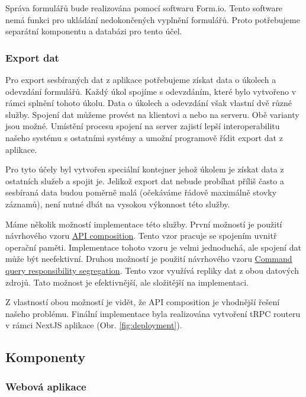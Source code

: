 Správa formulářů bude realizována pomocí softwaru Form.io.
Tento software nemá funkci pro ukládání nedokončených vyplnění formulářů.
Proto potřebujeme separátní komponentu a databázi pro tento účel.

\subsubsection{Export dat}\label{subsubsec:export-dat}

Pro export sesbíraných dat z aplikace potřebujeme získat data o úkolech a odevzdání formulářů.
Každý úkol spojíme s odevzdáním, které bylo vytvořeno v rámci splnění tohoto úkolu.
Data o úkolech a odevzdání však vlastní dvě různé služby.
Spojení dat můžeme provést na klientovi a nebo na serveru.
Obě varianty jsou možné.
Umístění procesu spojení na server zajistí lepší interoperabilitu našeho systému s ostatními systémy a umožní programově řídit export dat z aplikace.

Pro tyto účely byl vytvořen speciální kontejner jehož úkolem je získat data z ostatních služeb a spojit je.
Jelikož export dat nebude probíhat příliš často a sesbíraná data budou poměrně malá (očekáváme řádově maximálně stovky záznamů), není nutné dbát na vysokou výkonnost této služby.

Máme několik možností implementace této služby.
První možností je použití návrhového vzoru \href{https://microservices.io/patterns/data/api-composition.html}{API composition}.
Tento vzor pracuje se spojením uvnitř operační paměti.
Implementace tohoto vzoru je velmi jednoduchá, ale spojení dat může být neefektivní.
Druhou možností je použití návrhového vzoru \href{https://microservices.io/patterns/data/cqrs.html}{Command query responsibility segregation}.
Tento vzor využívá repliky dat z obou datových zdrojů.
Tato možnost je efektivnější, ale složitější na implementaci.

Z vlastností obou možností je vidět, že API composition je vhodnější řešení našeho problému.
Finální implementace byla realizována vytvoření tRPC routeru v rámci NextJS aplikace (Obr. \ref{fig:deployment}).

\subsection{Komponenty}\label{subsec:komponenty}

\subsubsection{Webová aplikace}

